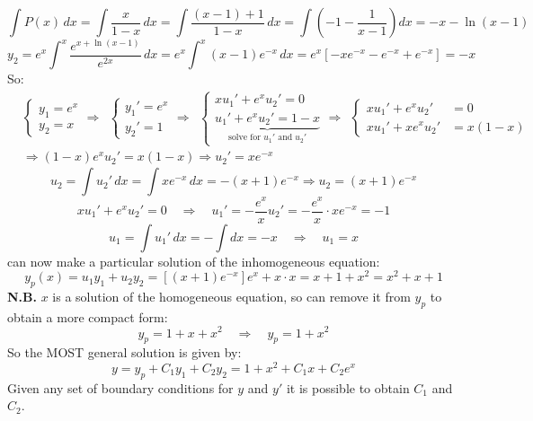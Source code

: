 \documentclass{article}
\begin{document}
\begin{equation*}
    \int P(x)\, dx = \int \frac{x}{1 - x} \, dx 
= \int \frac{(x - 1) + 1}{1 - x} \, dx 
= \int \left( -1 - \frac{1}{x - 1} \right) dx 
= -x - \ln(x - 1)
\end{equation*}
\begin{equation*}
    y_2 = e^x \int^x \frac{e^{x + \ln(x - 1)}}{e^{2x}} \, dx
= e^x \int^x (x - 1) e^{-x} \, dx
= e^x \left[ -x e^{-x} - e^{-x} + e^{-x} \right] = -x
\end{equation*}
So:
\begin{align*}
    &\begin{cases}
        y_1 = e^x \\ y_2 = x
    \end{cases} \Rightarrow \ \  \begin{cases}
        y_1' = e^x \\ y_2' = 1 
    \end{cases} \Rightarrow  \ \ \begin{cases}
         x u_1' + e^x u_2' = 0 \\ \underbrace{u_1' + e^x u_2' = 1 - x}_{\text{solve for $u_1'$ and $u_2 '$}}
    \end{cases} \Rightarrow \ \ \begin{cases}
        x u_1' + e^x u_2' &= 0 \\
x u_1' + x e^x u_2' &= x(1 - x)
    \end{cases} \\
    &\Rightarrow (1 - x) e^x u_2' = x(1 - x) \Rightarrow u_2' = x e^{-x}
\end{align*}
\begin{equation}
    u_2 = \int u_2'\, dx = \int x e^{-x}\, dx = - (x+1) e^{-x} \Rightarrow u_2 = (x + 1)e^{-x}
\end{equation}
\begin{equation}
    x u_1' + e^x u_2' = 0 
\quad \Rightarrow \quad 
u_1' = -\frac{e^x}{x} u_2' = -\frac{e^x}{x} \cdot x e^{-x} = -1
\end{equation}
\begin{equation}
    u_1 = \int u_1'\,dx = -\int dx = -x
\quad \Rightarrow \quad u_1 = x
\end{equation}
can now make a particular solution of the inhomogeneous equation:
\begin{equation}
    y_p(x) = u_1 y_1 + u_2 y_2 = \left[ (x+1)e^{-x} \right] e^x + x \cdot x = x+1 + x^2 = x^2 + x + 1
\end{equation}
\newpage
\noindent
\textbf{N.B. }$x$ is a solution of the homogeneous equation, so can remove it from $y_p$ to obtain a more compact form:
\begin{equation}
    y_p = 1 + x + x^2 \quad \Rightarrow \quad y_p = 1 + x^2
\end{equation}
So the MOST general solution is given by:
\begin{equation}
    y = y_p + C_1 y_1 + C_2 y_2 = 1 + x^2 + C_1 x + C_2 e^x
\end{equation}
Given any set of boundary conditions for $y$ and $y'$ it is possible to obtain $C_1$ and $C_2$.
\end{document}
